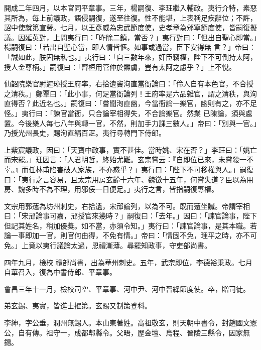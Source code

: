 \begin{pinyinscope}
 開成二年四月，以本官同平章事。三年，楊嗣復、李玨繼入輔政。夷行介特，素惡其所為，每上前議政，語侵嗣復，遂至往復。性不能堪，上表稱足疾辭位；不許，詔中使就第宣勞。七月，以王彥威為忠武節度使，史孝章為邠寧節度使，皆嗣復擬議。因延英對，上問夷行曰：「昨除二鎮，當否？」夷行對曰：「但出自聖心即當。」楊嗣復曰：「若出自聖心當，即人情皆愜。如事或過當，臣下安得無
 言？」帝曰：「誠如此，朕固無私也。」夷行曰：「自三數年來，奸臣竊權，陛下不可倒持太阿，授人金尊柄。」嗣復曰：「齊桓用管仲於讎虜，豈有太阿之慮乎？」上不悅。



 仙韶院樂官尉遲璋授王府率，右拾遺竇洵直當衙論曰：「伶人自有本色官，不合授之清秩。」鄭覃曰：「此小事，何足當衙論列！王府率是六品雜官，謂之清秩，與洵直得否？此近名也。」嗣復曰：「嘗聞洵直幽，今當衙論一樂官，幽則有之，亦不足怪。」夷行曰：「諫官當衙，只合論宰相得失，不合論樂官。然業
 已陳論，須與處置。今後樂人每七八年與轉一官，不然，則加手力課三數人。」帝曰：「別與一官。」乃授光州長史，賜洵直絹百疋。夷行尋轉門下侍郎。



 上紫宸議政，因曰：「天寶中政事，實不甚佳。當時姚、宋在否？」李玨曰：「姚亡而宋罷。」玨因言：「人君明哲，終始尤難。玄宗嘗云：『自即位已來，未嘗殺一不辜。』而任林甫陷害破人家族，不亦惑乎？」夷行曰：「陛下不可移權與人。」嗣復曰：「夷行之言容易，且太宗用房玄齡十六年、魏徵十五年，何嘗失道？臣以為用
 房、魏多時不為不理，用邪佞一日便足。」夷行之言，皆指嗣復專權。



 文宗用郭薳為坊州刺史，右拾遺，宋邧論列，以為不可。既而薳坐贓。帝謂宰相曰：「宋邧論事可嘉，邧授官來幾時？」嗣復曰：「去年。」因曰：「諫官論事，陛下但記其姓名，稍加優獎。如不當，亦須令知。」夷行曰：「諫官論事，是其本職。若論一事即加一官，則官何由得，不免有情。」帝曰：「情固不免，理平之時，亦不可免。」上竟以夷行議論太過，恩禮漸薄。尋罷知政事，守吏部尚書。



 四年九月，檢校
 禮部尚書，出為華州刺史。五年，武宗即位，李德裕秉政。七月自華召入，復為中書侍郎、平章事。



 會昌三年十一月，檢校司空、平章事、河中尹、河中晉絳節度使。卒，贈司徒。



 弟玄錫、夷實，皆進士擢第。玄賜又制策登科。



 李紳，字公垂，潤州無錫人。本山東著姓。高祖敬玄，則天朝中書令，封趙國文憲公，自有傳。祖守一，成都郫縣令。父晤，歷金壇、烏程、晉陵三縣令，因家無錫。




\end{pinyinscope}
